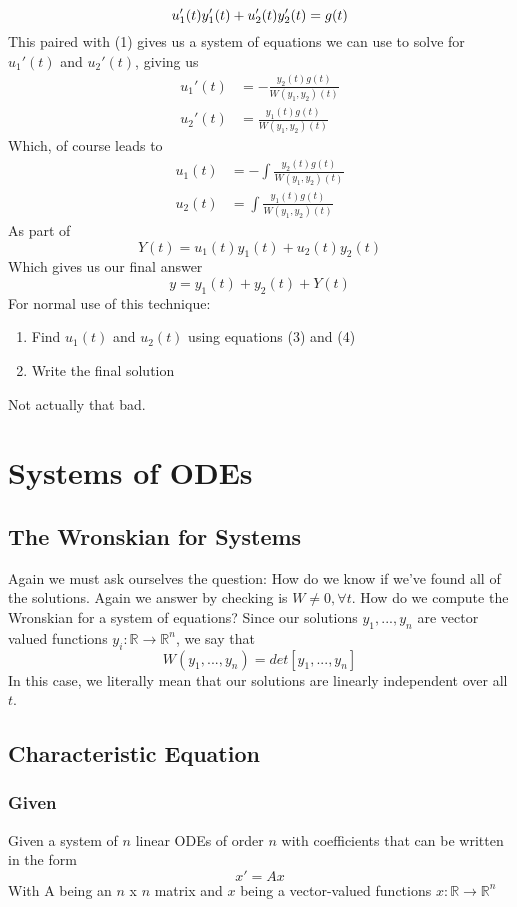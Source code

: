 \documentclass[11pt]{article}
\begin{document}
\begin{equation}
    u_1'(t)y_1'(t) + u_2'(t)y_2'(t) = g(t) \\
\end{equation}
This paired with (1) gives us a system of equations we can use to solve for $u_1'(t)$ and $u_2'(t)$, 
giving us
\begin{align*}
    u_1'(t) &= -\frac{y_2(t)g(t)}{W(y_1, y_2)(t)} \\
    u_2'(t) &= \frac{y_1(t)g(t)}{W(y_1, y_2)(t)}
\end{align*}
Which, of course leads to
\begin{align}
    u_1(t) &= -\int \frac{y_2(t)g(t)}{W(y_1, y_2)(t)} \\
    u_2(t) &= \int \frac{y_1(t)g(t)}{W(y_1, y_2)(t)}
\end{align}
As part of 
\[ Y(t) = u_1(t)y_1(t) + u_2(t)y_2(t) \]
Which gives us our final answer
\[ y = y_1(t) + y_2(t) + Y(t) \]
For normal use of this technique:
\begin{enumerate}
    \item Find $u_1(t)$ and $u_2(t)$ using equations (3) and (4)
    \item Write the final solution
    \end{enumerate}
Not actually that bad.
\section{Systems of ODEs}
\subsection{The Wronskian for Systems}
Again we must ask ourselves the question: How do we know if we've found all of the solutions. 
Again we answer by checking is $W \neq 0, \forall t$. How do we compute the Wronskian for 
a system of equations? Since our solutions $y_1, ..., y_n$ are vector valued functions 
$y_i: \mathbb{R} \rightarrow \mathbb{R}^n$, we say that
\[ W(y_1, ..., y_n) = det \left[y_1, ..., y_n \right] \]
In this case, we literally mean that our solutions are linearly independent over all $t$. 
\subsection{Characteristic Equation}
\subsubsection{Given}
Given a system of $n$ linear ODEs of order $n$ with coefficients that can be written in the form
\[ x' = Ax \]
With A being an $n$ x $n$ matrix and $x$ being a vector-valued functions $x: \mathbb{R} 
\rightarrow \mathbb{R}^n$
\end{document}
